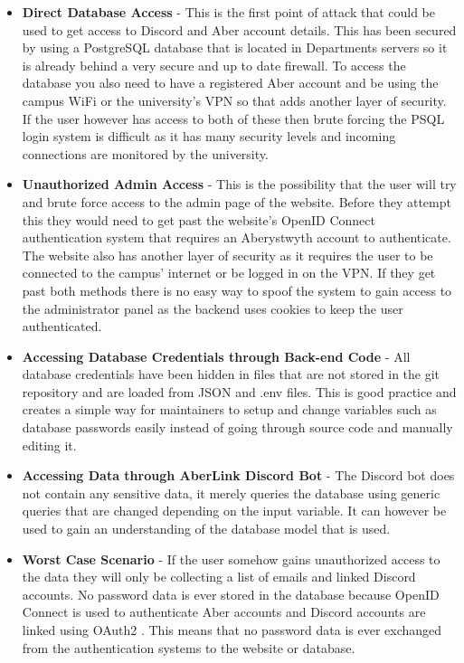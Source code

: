 \begin{itemize}
	\item \textbf{Direct Database Access} - This is the first point of attack that could be used to get access to Discord and Aber account details. This has been secured by using a PostgreSQL \cite{psql} database that is located in Departments servers so it is already behind a very secure and up to date firewall. To access the database you also need to have a registered Aber account and be using the campus WiFi or the university's VPN so that adds another layer of security. If the user however has access to both of these then brute forcing the PSQL login system is difficult as it has many security levels and incoming connections are monitored by the university.
	\item \textbf{Unauthorized Admin Access} - This is the possibility that the user will try and brute force access to the admin page of the website. Before they attempt this they would need to get past the website's OpenID Connect \cite{OpenID} authentication system that requires an Aberystwyth account to authenticate. The website also has another layer of security as it requires the user to be connected to the campus' internet or be logged in on the VPN. If they get past both methods there is no easy way to spoof the system to gain access to the administrator panel as the backend uses cookies to keep the user authenticated.
	\item \textbf{Accessing Database Credentials through Back-end Code} - All database credentials have been hidden in files that are not stored in the git repository and are loaded from JSON and .env files. This is good practice and creates a simple way for maintainers to setup and change variables such as database passwords easily instead of going through source code and manually editing it.
	\item \textbf{Accessing Data through AberLink Discord Bot} - The Discord bot does not contain any sensitive data, it merely queries the database using generic queries that are changed depending on the input variable. It can however be used to gain an understanding of the database model that is used.
	\item \textbf{Worst Case Scenario} - If the user somehow gains unauthorized access to the data they will only be collecting a list of emails and linked Discord accounts. No password data is ever stored in the database because  OpenID Connect \cite{OpenID} is used to authenticate Aber accounts and Discord accounts are linked using OAuth2 \cite{oauth2}. This means that no password data is ever exchanged from the authentication systems to the website or database.
\end{itemize}

